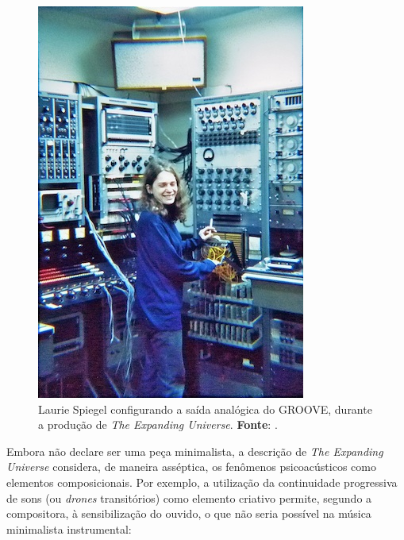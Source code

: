 \begin{figure}[!h]
  \begin{center}
  \includegraphics[scale=0.618]{./imagens/spiegel.jpg}
  \caption{\small Laurie Spiegel configurando a saída analógica do GROOVE, durante a produção de \emph{The Expanding Universe}. \textbf{Fonte}: \cite{spiegel_expanding_1975}.}
  \label{fig:groove}
  \end{center}
\end{figure}

Embora não declare ser uma peça minimalista, a descrição de \emph{The Expanding Universe} considera, de maneira asséptica, os fenômenos psicoacústicos como elementos composicionais. Por exemplo, a utilização da continuidade progressiva de sons (ou \emph{drones} transitórios) como elemento criativo permite, segundo a compositora, à sensibilização do ouvido, o que não seria possível na música minimalista instrumental:

